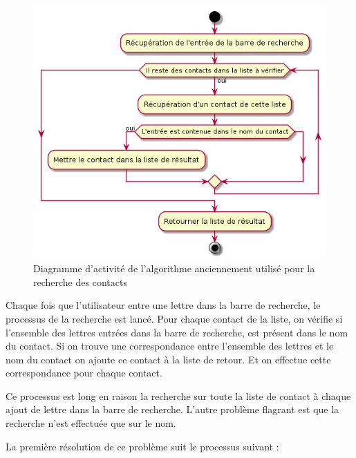 \begin{figure}[!h]
	\centering
	\includegraphics[scale=0.8]{img/activity_retrieve_old.png}
	\caption{\label{activity_retrieve_old} {Diagramme d'activité de l'algorithme anciennement utilisé pour la recherche des contacts}}
\end{figure}

Chaque fois que l'utilisateur entre une lettre dans la barre de recherche, le processus de la recherche est lancé. Pour chaque contact de la liste, on vérifie si l'ensemble des lettres entrées dans la barre de recherche, est présent dans le nom du contact. Si on trouve une correspondance entre l'ensemble des lettres et le nom du contact on ajoute ce contact à la liste de retour. Et on effectue cette correspondance pour chaque contact.

Ce processus est long en raison la recherche sur toute la liste de contact à chaque ajout de lettre dans la barre de recherche. L'autre problème flagrant est que la recherche n'est effectuée que sur le nom.

\newpage

La première résolution de ce problème suit le processus suivant :

